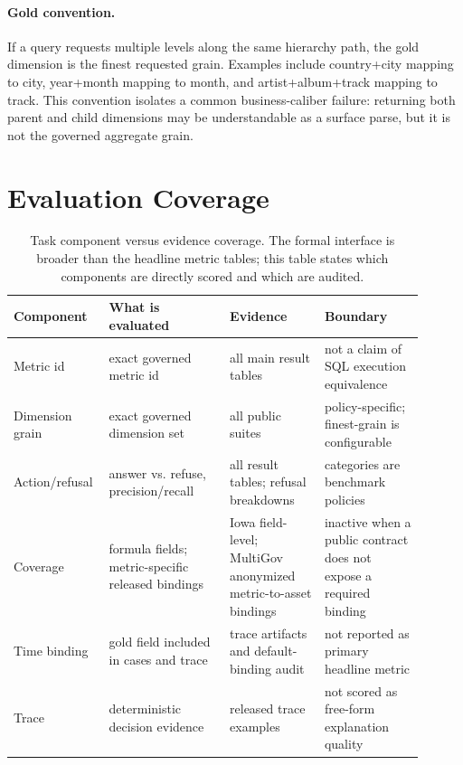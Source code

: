 \documentclass[letterpaper]{article}
\begin{document}
\paragraph{Gold convention.}
If a query requests multiple levels along the same hierarchy path, the gold dimension is the finest requested grain. Examples include country+city mapping to city, year+month mapping to month, and artist+album+track mapping to track. This convention isolates a common business-caliber failure: returning both parent and child dimensions may be understandable as a surface parse, but it is not the governed aggregate grain.

\section{Evaluation Coverage}

\begin{table}[h]
\centering
\scriptsize
\setlength{\tabcolsep}{2pt}
\begin{tabular}{@{}>{\raggedright\arraybackslash}p{0.17\linewidth}>{\raggedright\arraybackslash}p{0.28\linewidth}>{\raggedright\arraybackslash}p{0.22\linewidth}>{\raggedright\arraybackslash}p{0.23\linewidth}@{}}
\toprule
Component & What is evaluated & Evidence & Boundary \\
\midrule
Metric id & exact governed metric id & all main result tables & not a claim of SQL execution equivalence \\
Dimension grain & exact governed dimension set & all public suites & policy-specific; finest-grain is configurable \\
Action/refusal & answer vs. refuse, precision/recall & all result tables; refusal breakdowns & categories are benchmark policies \\
Coverage & formula fields; metric-specific released bindings & Iowa field-level; MultiGov anonymized metric-to-asset bindings & inactive when a public contract does not expose a required binding \\
Time binding & gold field included in cases and trace & trace artifacts and default-binding audit & not reported as primary headline metric \\
Trace & deterministic decision evidence & released trace examples & not scored as free-form explanation quality \\
\bottomrule
\end{tabular}
\caption{Task component versus evidence coverage. The formal interface is broader than the headline metric tables; this table states which components are directly scored and which are audited.}
\end{table}
\end{document}

